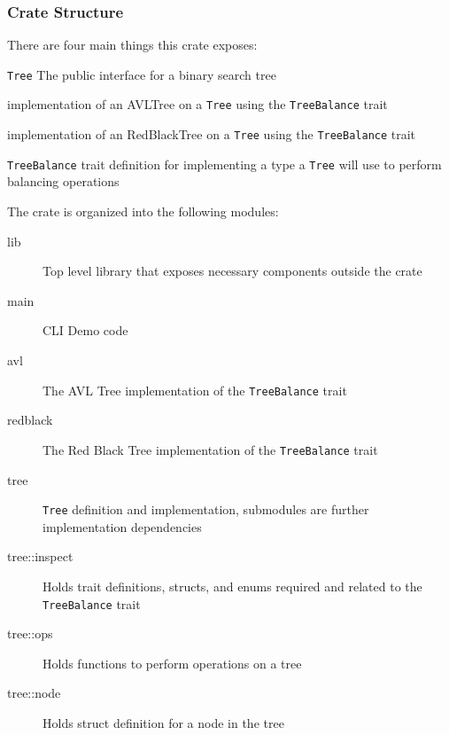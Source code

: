 \documentclass[11pt, letterpaper]{article}
\begin{document}
\subsubsection{Crate Structure}
There are four main things this crate exposes:
\begin{description}
    \item\texttt{Tree} The public interface for a binary search tree
    \item[AVLTree] implementation of an AVLTree on a \texttt{Tree} using the \texttt{TreeBalance} trait
    \item[RedBlackTree] implementation of an RedBlackTree on a \texttt{Tree} using the \texttt{TreeBalance} trait
    \item\texttt{TreeBalance} trait definition for implementing a type a \texttt{Tree} will use to perform balancing operations
\end{description}
\hfill \break
\noindent The crate is organized into the following modules:
\begin{description}
    \item[lib] Top level library that exposes necessary components outside the crate
    \item[main] CLI Demo code
    \item[avl] The AVL Tree implementation of the \texttt{TreeBalance} trait
    \item[redblack] The Red Black Tree implementation of the \texttt{TreeBalance} trait
    \item[tree] \texttt{Tree} definition and implementation, submodules are further implementation dependencies
    \item[tree::inspect] Holds trait definitions, structs, and enums required and related to the \texttt{TreeBalance} trait
    \item[tree::ops] Holds functions to perform operations on a tree
    \item[tree::node] Holds struct definition for a node in the tree
\end{description}
\end{document}

